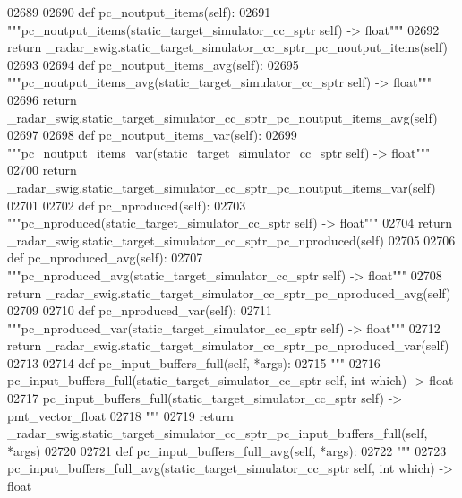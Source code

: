 \begin{DoxyCode}
{{{{{{{{{{02689 
02690     \textcolor{keyword}{def }pc_noutput_items(self):
02691         \textcolor{stringliteral}{"""pc\_noutput\_items(static\_target\_simulator\_cc\_sptr self) -> float"""}
02692         \textcolor{keywordflow}{return} \_radar\_swig.static\_target\_simulator\_cc\_sptr\_pc\_noutput\_items(self)
02693 
02694     \textcolor{keyword}{def }pc_noutput_items_avg(self):
02695         \textcolor{stringliteral}{"""pc\_noutput\_items\_avg(static\_target\_simulator\_cc\_sptr self) -> float"""}
02696         \textcolor{keywordflow}{return} \_radar\_swig.static\_target\_simulator\_cc\_sptr\_pc\_noutput\_items\_avg(self)
02697 
02698     \textcolor{keyword}{def }pc_noutput_items_var(self):
02699         \textcolor{stringliteral}{"""pc\_noutput\_items\_var(static\_target\_simulator\_cc\_sptr self) -> float"""}
02700         \textcolor{keywordflow}{return} \_radar\_swig.static\_target\_simulator\_cc\_sptr\_pc\_noutput\_items\_var(self)
02701 
02702     \textcolor{keyword}{def }pc_nproduced(self):
02703         \textcolor{stringliteral}{"""pc\_nproduced(static\_target\_simulator\_cc\_sptr self) -> float"""}
02704         \textcolor{keywordflow}{return} \_radar\_swig.static\_target\_simulator\_cc\_sptr\_pc\_nproduced(self)
02705 
02706     \textcolor{keyword}{def }pc_nproduced_avg(self):
02707         \textcolor{stringliteral}{"""pc\_nproduced\_avg(static\_target\_simulator\_cc\_sptr self) -> float"""}
02708         \textcolor{keywordflow}{return} \_radar\_swig.static\_target\_simulator\_cc\_sptr\_pc\_nproduced\_avg(self)
02709 
02710     \textcolor{keyword}{def }pc_nproduced_var(self):
02711         \textcolor{stringliteral}{"""pc\_nproduced\_var(static\_target\_simulator\_cc\_sptr self) -> float"""}
02712         \textcolor{keywordflow}{return} \_radar\_swig.static\_target\_simulator\_cc\_sptr\_pc\_nproduced\_var(self)
02713 
02714     \textcolor{keyword}{def }pc_input_buffers_full(self, *args):
02715         \textcolor{stringliteral}{"""}
02716 \textcolor{stringliteral}{        pc\_input\_buffers\_full(static\_target\_simulator\_cc\_sptr self, int which) -> float}
02717 \textcolor{stringliteral}{        pc\_input\_buffers\_full(static\_target\_simulator\_cc\_sptr self) -> pmt\_vector\_float}
02718 \textcolor{stringliteral}{        """}
02719         \textcolor{keywordflow}{return} \_radar\_swig.static\_target\_simulator\_cc\_sptr\_pc\_input\_buffers\_full(self, *args)
02720 
02721     \textcolor{keyword}{def }pc_input_buffers_full_avg(self, *args):
02722         \textcolor{stringliteral}{"""}
02723 \textcolor{stringliteral}{        pc\_input\_buffers\_full\_avg(static\_target\_simulator\_cc\_sptr self, int which) -> float}
}}}}}}}}}}
\end{DoxyCode}
